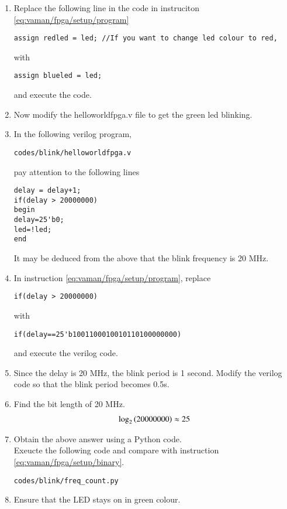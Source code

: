 \begin{enumerate}[label=\arabic*.,ref=\theenumi]
\item Replace  the following line in the code in instruciton  \ref{eq:vaman/fpga/setup/program} 
\begin{lstlisting}
assign redled = led; //If you want to change led colour to red,
\end{lstlisting}
with
\begin{lstlisting}
assign blueled = led; 
\end{lstlisting}
and execute the code.
\item Now modify the helloworldfpga.v  file to get the green led blinking.
\item In the following verilog program, 
\label{eq:vaman/fpga/setup/program}
\begin{lstlisting}
codes/blink/helloworldfpga.v
\end{lstlisting}
pay attention to the following lines
\begin{lstlisting}
delay = delay+1;                                                                                                   
if(delay > 20000000)
begin
delay=25'b0;
led=!led;
end
\end{lstlisting}
It may be deduced from the above that the blink frequency is 20 MHz.
\item In instruction  \ref{eq:vaman/fpga/setup/program}, replace
\label{eq:vaman/fpga/setup/binary}
\begin{lstlisting}
if(delay > 20000000)
\end{lstlisting}
%
with
\begin{lstlisting}
if(delay==25'b1001100010010110100000000)
\end{lstlisting}
and execute the verilog code.
\item Since the delay is 20 MHz, the blink period is 1 second.  Modify the verilog code
so that the blink period becomes 0.5s.
\item Find the bit length of 20 MHz.
\\
\solution 
\begin{align}
\log_2\left(20000000\right) \approx 25
\end{align}
\item Obtain the above answer using a Python code.
\\
\solution Exeucte the following code and compare with instruction  \ref{eq:vaman/fpga/setup/binary}.
\begin{lstlisting}
codes/blink/freq_count.py
\end{lstlisting}
\item Ensure that the LED stays on in green colour.

\end{enumerate}
